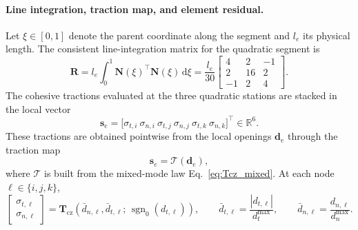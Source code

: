 \documentclass[smallextended]{svjour3}       %
\newcommand{\vb}[1]{\bm{#1}}      %
\newcommand{\mat}[1]{\mathbf{#1}}  %
\providecommand{\bd}{\vb d}
\renewcommand{\bd}{\vb d}
\begin{document}
\paragraph{Line integration, traction map, and element residual.}
Let \(\xi\in[0,1]\) denote the parent coordinate along the segment and
\(l_e\) its physical length. The consistent line-integration matrix for the
quadratic segment is
\begin{equation}
	\mat R
	=
	l_e\int_0^1 \bm N(\xi)^\top \bm N(\xi)\,\mathrm d\xi
	=
	\frac{l_e}{30}
	\begin{bmatrix}
		4 & 2 & -1\\
		2 & 16 & 2\\
		-1 & 2 & 4
	\end{bmatrix}.
	\label{eq:seg-R}
\end{equation}
The cohesive tractions evaluated at the three quadratic stations are stacked
in the local vector
\begin{equation}
	\vb s_e
	=
	\big[
	\sigma_{t,i}\ \sigma_{n,i}\ 
	\sigma_{t,j}\ \sigma_{n,j}\ 
	\sigma_{t,k}\ \sigma_{n,k}
	\big]^\top
	\in\mathbb R^6.
	\label{eq:seg-se}
\end{equation}
These tractions are obtained pointwise from the local openings
\(\bd_e\) through the traction map
\begin{equation}
	\vb s_e=\mathcal T(\bd_e),
	\label{eq:seg-Te}
\end{equation}
where \(\mathcal T\) is built from the mixed-mode law
Eq.~\eqref{eq:Tcz_mixed}. At each node
\(\ell\in\{i,j,k\}\),
\begin{equation}
	\begin{bmatrix}
		\sigma_{t,\ell}\\[3pt]
		\sigma_{n,\ell}
	\end{bmatrix}
	=
	\mathbf{T}_{\mathrm{cz}}
	\!\left(
	\bar d_{n,\ell},\bar d_{t,\ell};\,\operatorname{sgn}_0(d_{t,\ell})
	\right),
	\qquad
	\bar d_{t,\ell}=\frac{|d_{t,\ell}|}{d_t^{\max}},
	\qquad
	\bar d_{n,\ell}=\frac{d_{n,\ell}}{d_n^{\max}}.
	\label{eq:seg-node-traction}
\end{equation}
\end{document}

